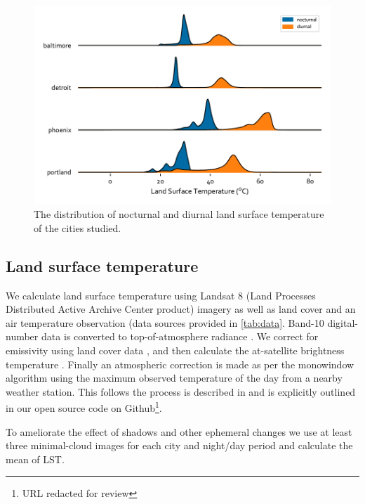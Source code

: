 \documentclass[]{elsarticle}
\begin{document}
\begin{figure}[H]
    \centering
    \includegraphics[width=\linewidth]{fig/report/joyplot_lst.pdf}
    \caption{The distribution of nocturnal and diurnal land surface temperature of the cities studied.}
    \label{fig:joy}
\end{figure}

\subsection{Land surface temperature}
We calculate land surface temperature using Landsat 8 (Land Processes Distributed Active Archive Center product) imagery as well as land cover and an air temperature observation (data sources provided in \ref{tab:data}. Band-10 digital-number data is converted to top-of-atmosphere radiance \cite{Jimenez-Munoz2003-wc}. We correct for emissivity using land cover data \cite{Alipour2003-gb}, and then calculate the at-satellite brightness temperature \cite{Jimenez-Munoz2003-wc}. Finally an atmospheric correction is made as per the monowindow algorithm \cite{Qin2001-jn} using the maximum observed temperature of the day from a nearby weather station. This follows the process is described in \cite{Scott2016-lc} and is explicitly outlined in our open source code on Github\footnote{URL redacted for review}. 

To ameliorate the effect of shadows and other ephemeral changes we use at least three minimal-cloud images for each city and night/day period and calculate the mean of LST.
\end{document}
